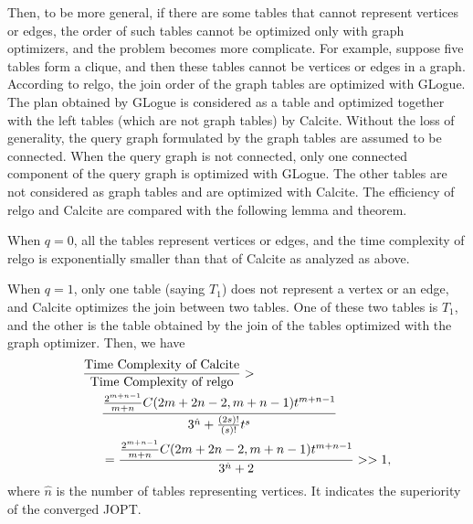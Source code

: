 Then, to be more general, if there are some tables that cannot represent vertices or edges, the order of such tables cannot be optimized only with graph optimizers, and the problem becomes more complicate.
For example, suppose five tables form a clique, and then these tables cannot be vertices or edges in a graph.
According to relgo, the join order of the graph tables are optimized with GLogue.
The plan obtained by GLogue is considered as a table and optimized together with the left tables (which are not graph tables) by Calcite.
Without the loss of generality, the query graph formulated by the graph tables are assumed to be connected.
When the query graph is not connected, only one connected component of the query graph is optimized with GLogue.
The other tables are not considered as graph tables and are optimized with Calcite.
The efficiency of relgo and Calcite are compared with the following lemma and theorem.


\iffalse
When $q = 0$, all the tables represent vertices or edges, and the time complexity of relgo is exponentially smaller than that of Calcite as analyzed as above.

When $q = 1$, only one table (saying $T_1$) does not represent a vertex or an edge, and Calcite optimizes the join between two tables.
One of these two tables is $T_1$, and the other is the table obtained by the join of the tables optimized with the graph optimizer.
Then, we have
\begin{equation*}
    \begin{split}
        \frac{\text{Time Complexity of Calcite}}{\text{Time Complexity of relgo}} > \hspace{-12em} & \\
        & \frac{\frac{2^{m+n-1}}{m+n}C(2m+2n-2, m+n-1)t^{m + n - 1}}{3^{\hat{n}} + \frac{(2s)!}{(s)!}t^{s}} \\
        & = \frac{\frac{2^{m+n-1}}{m+n}C(2m+2n-2, m+n-1)t^{m + n - 1}}{3^{\hat{n}} + 2} >> 1,
    \end{split}
\end{equation*}
where $\hat{n}$ is the number of tables representing vertices.
It indicates the superiority of the converged JOPT.


